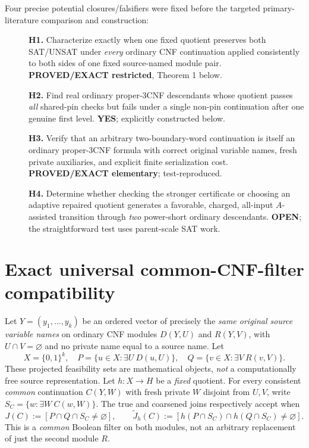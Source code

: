 \documentclass[11pt]{article}
\begin{document}
Four precise potential closures/falsifiers were fixed before the targeted
primary-literature comparison and construction:
\begin{description}
\item[] \textbf{H1.} Characterize exactly when one fixed quotient preserves
both SAT/UNSAT under \emph{every} ordinary CNF continuation applied consistently
to both sides of one fixed source-named module pair. \textbf{PROVED/EXACT
restricted}, Theorem 1 below.
\item[] \textbf{H2.} Find real ordinary proper-3CNF descendants whose quotient
passes \emph{all} shared-pin checks but fails under a single non-pin continuation
after one genuine first level. \textbf{YES}; explicitly constructed below.
\item[] \textbf{H3.} Verify that an arbitrary two-boundary-word continuation
is itself an ordinary proper-3CNF formula with correct original variable
names, fresh private auxiliaries, and explicit finite serialization cost.
\textbf{PROVED/EXACT elementary}; test-reproduced.
\item[] \textbf{H4.} Determine whether checking the stronger certificate
or choosing an adaptive repaired quotient generates a favorable, charged,
all-input $A$-assisted transition through \emph{two} power-short
ordinary descendants. \textbf{OPEN}; the straightforward test uses
parent-scale SAT work.
\end{description}

\section{Exact universal common-CNF-filter compatibility}
Let $Y=(y_1,\ldots,y_k)$ be an ordered vector of precisely the
\emph{same original source variable names} on ordinary CNF modules
$D(Y,U)$ and $R(Y,V)$, with $U\cap V=\varnothing$ and no private name
equal to a source name. Let
\[
 X=\{0,1\}^k,\quad
 P=\{u\in X:\exists U\ D(u,U)\},\quad
 Q=\{v\in X:\exists V\ R(v,V)\}.
\]
These projected feasibility sets are mathematical objects, \emph{not}
a computationally free source representation. Let $h:X\to H$ be
a \emph{fixed} quotient. For every consistent \emph{common}
continuation $C(Y,W)$ with fresh private $W$ disjoint from $U,V$,
write $S_C=\{w:\exists W\ C(w,W)\}$. The true and coarsened
joins respectively accept when
\[
 J(C):=[P\cap Q\cap S_C\ne\varnothing],\qquad
 \widetilde J_h(C):=
 [h(P\cap S_C)\cap h(Q\cap S_C)\ne\varnothing].
\]
This is a \emph{common} Boolean filter on both modules, not an arbitrary
replacement of just the second module $R$.
\end{document}
